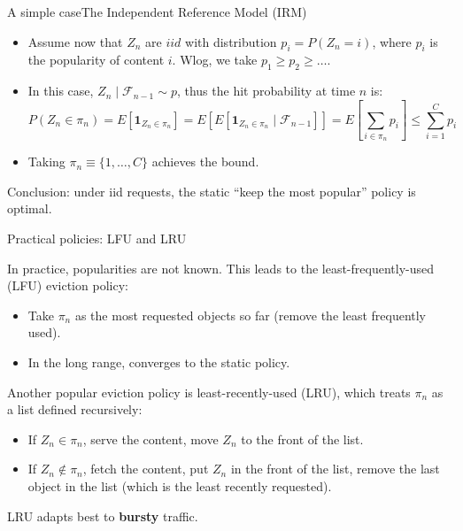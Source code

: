 \documentclass[aspectratio=169]{beamer}
\newcommand{\E}[1]{E\left[#1 \right]}
\newcommand{\ind}[1]{\mathbf{1}_{#1}}
\newenvironment*{myitem}[1][1.5em]{\begin{itemize}\setlength{\itemsep}{#1}}{\end{itemize}}
\begin{document}
\begin{frame}{A simple case}{The Independent Reference Model (IRM)}

  \begin{myitem}
    \item Assume now that $Z_n$ are $iid$ with distribution $p_i = P(Z_n=i)$, where $p_i$ is the \alert{popularity} of content $i$. Wlog, we take $p_1\geqslant p_2 \geqslant \ldots$.
    \item In this case, $Z_n\mid \mathcal{F}_{n-1} \sim p$, thus the hit probability at time $n$ is:
    \begin{equation*}
      P(Z_n \in \pi_n) = \E{\ind{Z_n\in\pi_n}} = \E{\E{\ind{Z_n\in \pi_n} \mid \mathcal{F}_{n-1}}} = \E{\sum_{i\in\pi_n} p_i} \leqslant \sum_{i=1}^C p_i
    \end{equation*}

    \item Taking $\pi_n \equiv \{1,\ldots,C\}$ achieves the bound.
    
  \end{myitem}
  \pause

  \vfill

  \alert{Conclusion:} under iid requests, the static ``keep the most popular'' policy is optimal.

\end{frame}

\begin{frame}{Practical policies: LFU and LRU}

  In practice, popularities are not known. This leads to the \alert{least-frequently-used (LFU)} eviction policy:
  \smallskip
  \begin{itemize}
    \item Take $\pi_n$ as the most requested objects so far (remove the least frequently used).
    \item In the long range, converges to the static policy.
  \end{itemize}

  \vfill

  Another popular eviction policy is \alert{least-recently-used (LRU)}, which treats $\pi_n$ as a list defined recursively:
  \smallskip
  \begin{itemize}
    \item If $Z_n \in \pi_n$, serve the content, move $Z_n$ to the front of the list.
    \item If $Z_n \notin \pi_n$, fetch the content, put $Z_n$ in the front of the list, remove the last object in the list (which is the least recently requested).
  \end{itemize}

\alert{LRU} adapts best to \textbf{bursty} traffic.

\end{frame}
\end{document}
